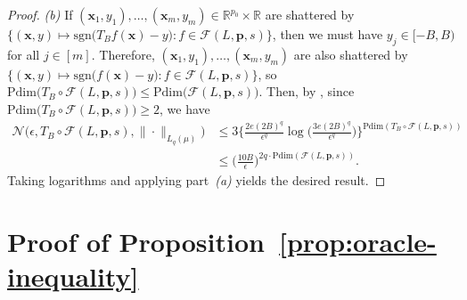 \documentclass[12pt]{article}
\begin{document}
\begin{proof}
    \medskip \emph{(b)} If $(\bm x_1,y_1),\ldots,(\bm x_m,y_m) \in \mathbb{R}^{p_0} \times \mathbb{R}$ are shattered by $\bigl\{(\bm x,y) \mapsto \mathrm{sgn}\bigl(T_B f(\bm x)-y\bigr) : f\in\mathcal{F}(L,\bm p,s)\bigr\}$, then we must have $y_j\in[-B,B)$ for all $j\in[m]$. Therefore, $(\bm x_1,y_1),\ldots,(\bm x_m,y_m)$ are also shattered by $\bigl\{(\bm x,y) \mapsto \mathrm{sgn}\bigl(f(\bm x)-y\bigr) : f\in\mathcal{F}(L,\bm p,s)\bigr\}$, so $\mathrm{Pdim}\bigl(T_B \circ \mathcal{F}(L,\bm p,s)\bigr) \leq \mathrm{Pdim}\bigl(\mathcal{F}(L,\bm p,s)\bigr)$. Then, by \citet[Theorem~9.4]{gyorfi2006distribution}, since $\mathrm{Pdim}\bigl(T_B \circ \mathcal{F}(L,\bm p,s)\bigr) \geq 2$, we have
    \begin{align*}
        \mathcal{N}\bigl( \epsilon, T_B \circ \mathcal{F}(L,\bm p,s), \|\cdot\|_{L_q(\mu)} \bigr) &\leq 3\biggl\{ \frac{2e(2B)^q}{\epsilon^q} \log \biggl(\frac{3e(2B)^q}{\epsilon^q}\biggr) \biggr\}^{\mathrm{Pdim}(T_B \circ \mathcal{F}(L,\bm p,s))}\\
        &\leq \biggl(\frac{10B}{\epsilon}\biggr)^{2q\cdot\mathrm{Pdim}(\mathcal{F}(L,\bm p,s))}.
    \end{align*}
    Taking logarithms and applying part~\emph{(a)} yields the desired result.
\end{proof}


\section{Proof of Proposition~\ref{prop:oracle-inequality}}
\end{document}
